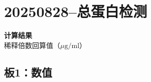 \documentclass[UTF8,10pt,a4paper,fontset=fandol]{ctexart}
\begin{document}

\newpage

\section{20250828--总蛋白检测}

\noindent\textbf{计算结果}\\
稀释倍数回算值（$\mu\mathrm{g}/\mathrm{ml}$）

\subsection{板1：数值}
\end{document}
